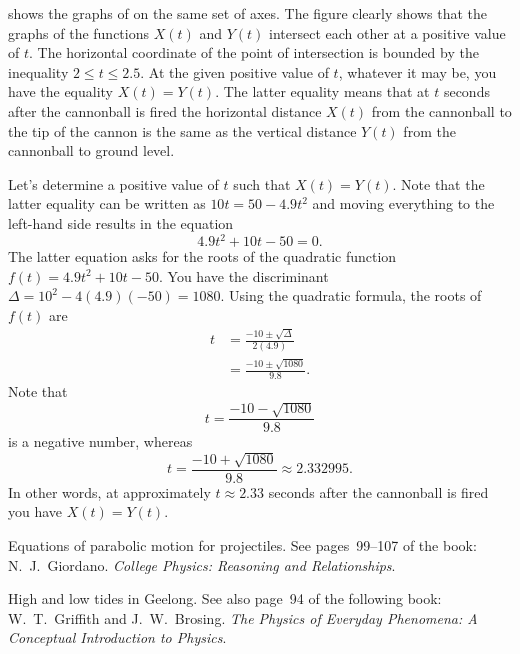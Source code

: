 \documentclass[a4paper,oneside,12pt]{article}
\begin{document}
\begin{problem}
{\begin{solution}
 shows the graphs of
on the same set of axes.  The figure clearly shows that the graphs of
the functions $X(t)$ and $Y(t)$ intersect each other at a positive
value of $t$.  The horizontal coordinate of the point of intersection
is bounded by the inequality $2 \leq t \leq 2.5$.  At the given
positive value of $t$, whatever it may be, you have the equality
$X(t) = Y(t)$.  The latter equality means that at $t$ seconds after
the cannonball is fired the horizontal distance $X(t)$ from the
cannonball to the tip of the cannon is the same as the vertical
distance $Y(t)$ from the cannonball to ground level.

Let's determine a positive value of $t$ such that $X(t) = Y(t)$.  Note
that the latter equality can be written as
$10t = 50 - 4.9t^2$ and moving everything to the left-hand side
results in the equation
\[
4.9t^2 + 10t - 50
=
0.
\]
The latter equation asks for the roots of the quadratic function
$f(t) = 4.9t^2 + 10t - 50$.  You have the discriminant
$\Delta = 10^2 - 4(4.9)(-50) = 1080$.  Using the quadratic formula,
the roots of $f(t)$ are
\begin{align*}
t
&=
\frac{
  -10 \pm \sqrt{\Delta}
}{
  2(4.9)
} \\[4pt]
&=
\frac{
  -10 \pm \sqrt{1080}
}{
  9.8
}.
\end{align*}
Note that
\[
t
=
\frac{
  -10 - \sqrt{1080}
}{
  9.8
}
\]
is a negative number, whereas
\[
t
=
\frac{
  -10 + \sqrt{1080}
}{
  9.8
}
\approx
2.332995.
\]
In other words, at approximately $t \approx 2.33$ seconds after the
cannonball is fired you have $X(t) = Y(t)$.
\end{solution}
}{}

\item Equations of parabolic motion for projectiles.  See
  pages~99--107 of the book:  N.~J.~Giordano.
  \emph{College Physics: Reasoning and Relationships}.

\item High and low tides in Geelong.  See also page~94 of the
  following book: W.~T.~Griffith and J.~W.~Brosing.  \emph{The Physics
    of Everyday Phenomena: A Conceptual Introduction to Physics}.
\end{problem}
\end{document}
